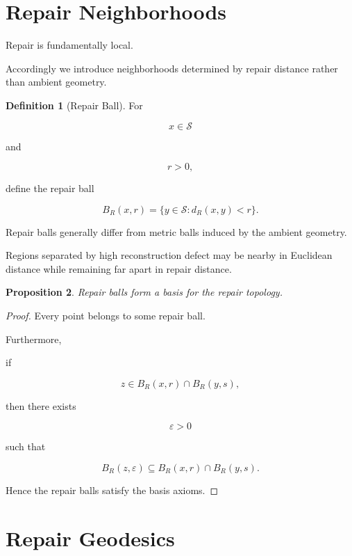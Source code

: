 \documentclass[11pt]{book}
\numberwithin{equation}{chapter}
\theoremstyle{definition}
\newtheorem{definition}{Definition}[chapter]
\theoremstyle{plain}
\newtheorem{proposition}[definition]{Proposition}
\begin{document}
\section{Repair Neighborhoods}

Repair is fundamentally local.

Accordingly we introduce neighborhoods determined by repair distance
rather than ambient geometry.

\begin{definition}[Repair Ball]

For

\[
x
\in
\mathcal S
\]

and

\[
r>0,
\]

define the repair ball

\[
B_R(x,r)
=
\{
y\in\mathcal S:
d_R(x,y)<r
\}.
\]

\end{definition}

Repair balls generally differ from metric balls induced by the ambient
geometry.

Regions separated by high reconstruction defect may be nearby in
Euclidean distance while remaining far apart in repair distance.

\begin{proposition}

Repair balls form a basis for the repair topology.

\end{proposition}

\begin{proof}

Every point belongs to some repair ball.

Furthermore,

if

\[
z
\in
B_R(x,r)
\cap
B_R(y,s),
\]

then there exists

\[
\varepsilon>0
\]

such that

\[
B_R(z,\varepsilon)
\subseteq
B_R(x,r)
\cap
B_R(y,s).
\]

Hence the repair balls satisfy the basis axioms.

\end{proof}

\section{Repair Geodesics}
\end{document}
